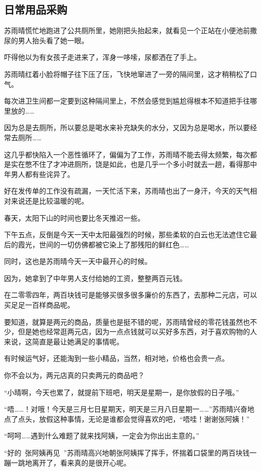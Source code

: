 \subsection{日常用品采购}

苏雨晴慌忙地跑进了公共厕所里，她刚把头抬起来，就看见一个正站在小便池前撒尿的男人抬头看了她一眼。

吓得他以为有女孩子走进来了，浑身一哆嗦，尿都洒在了手上。

苏雨晴红着小脸将帽子往下压了压，飞快地窜进了一旁的隔间里，这才稍稍松了口气。

每次进卫生间都一定要到这种隔间里上，不然会感觉到尴尬得根本不知道把手往哪里放的……

因为总是去厕所，所以要总是喝水来补充缺失的水分，又因为总是喝水，所以要经常去厕所……

这几乎都快陷入一个恶性循环了，偏偏为了工作，苏雨晴不能去得太频繁，每次都是实在憋不住了才冲进厕所，饶是如此，也是几乎一个多小时就去一趟，看得那中年男人都有些诧异了。

好在发传单的工作没有疏漏，一天忙活下来，苏雨晴也出了一身汗，今天的天气相对来说还是比较温暖的呢。

春天，太阳下山的时间也要比冬天推迟一些。

下午五点，反倒是今天一天中太阳最强烈的时候，那些柔软的白云也无法遮住它最后的霞光，世间的一切仿佛都被它染上了那残阳的鲜红色……

同时，这也是苏雨晴今天一天中最开心的时候。

因为，她拿到了中年男人支付给她的工资，整整两百元钱。

在二零零四年，两百块钱可是能够买很多很多廉价的东西了，去那种二元店，可以买足足一百样商品呢。

要知道，就算是两元的商品，质量也是挺不错的呢，苏雨晴曾经的零花钱虽然也不少，但是她也经常逛两元店，因为一点点钱就可以买好多东西，对于喜欢购物的人来说，这简直是最让她满足的事情呢。

有时候运气好，还能淘到一些小精品，当然，相对地，价格也会贵一点。

你不会以为，两元店真的只卖两元的商品吧？

“小晴啊，今天也累了，就提前下班吧，明天是星期一，是你放假的日子哦。”

“唔……！对哦！今天是三月七日星期天，明天是三月八日星期一……”苏雨晴兴奋地点了点头，放假这种事情，无论是谁都会觉得喜欢的吧，“唔哇！谢谢张阿姨！”

“呵呵……遇到什么难题了就来找阿姨，一定会为你出出主意的。”

“好的~张阿姨再见~”苏雨晴高兴地朝张阿姨挥了挥手，怀揣着口袋里的两百块钱一蹦一跳地离开了，看来真的是很开心呢。

